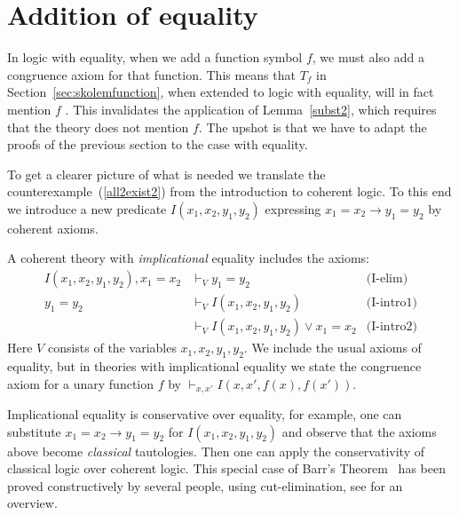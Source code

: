 \documentclass[10pt,a4paper]{article}
\begin{document}

\section{Addition of equality}\label{sec:addequality}

In logic with equality, when we add a function symbol $f$, 
we must also add a congruence axiom for that function. 
This means that $T_f$ in Section~\ref{sec:skolemfunction},
when extended to  logic with equality, will in fact mention $f$ . 
This invalidates the application of Lemma~\ref{subst2}, 
which requires that the theory does not mention $f$.
The upshot is that we have to adapt the proofs of the
previous section to the case with equality.

To get a clearer picture of what is needed we translate the 
counterexample~(\ref{all2exist2}) from the introduction to coherent logic.
To this end we introduce a new predicate $I(x_1,x_2,y_1,y_2)$
expressing $x_1=x_2 \to y_1=y_2$ by coherent axioms.

\begin{definition}\label{def:implicational_equality}
A coherent theory with \emph{implicational} equality includes the axioms:
\begin{align*}
 I(x_1,x_2,y_1,y_2), x_1=x_2 & \vdash_V                 y_1=y_2  &\text{(I-elim)}\\
 y_1=y_2                                  &\vdash_V                 I(x_1,x_2,y_1,y_2)&\text{(I-intro1)}\\ 
                                                 &\vdash_V                 I(x_1,x_2,y_1,y_2) \lor x_1= x_2&\text{(I-intro2)}
\end{align*}
Here $V$ consists of  the variables $x_1,x_2,y_1,y_2$.
We include the usual axioms of equality, but
in theories with implicational equality we state the congruence axiom for 
a unary function $f$ by $\vdash_{x,x'} I(x,x',f(x),f(x'))$.
\end{definition}

Implicational equality is conservative over equality, for example,
one can substitute $x_1=x_2 \to y_1=y_2$
for $I(x_1,x_2,y_1,y_2)$ and observe that the axioms above become
\emph{classical} tautologies. Then one can apply the conservativity of 
classical logic over coherent logic. 
This special case of Barr's Theorem~\cite{Barr} has been proved
constructively by several people, using cut-elimination,
see \cite[Sec. 6]{Negri03} for an overview.
\end{document}
